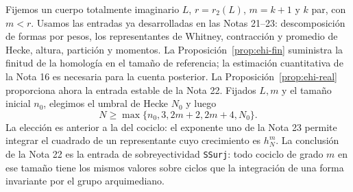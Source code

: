 Fijemos un cuerpo totalmente imaginario $L$, $r=r_2(L)$, $m=k+1$ y $k$ par, con $m<r$. Usamos las entradas ya desarrolladas en las Notas 21--23: descomposición de formas por pesos, los representantes de Whitney, contracción y promedio de Hecke, altura, partición y momentos. La Proposición~\ref{prop:ehi-fin} suministra la finitud de la homología en el tamaño de referencia; la estimación cuantitativa de la Nota 16 es necesaria para la cuenta posterior. La Proposición~\ref{prop:ehi-real} proporciona ahora la entrada estable de la Nota 22. Fijados $L,m$ y el tamaño inicial $n_0$, elegimos el umbral de Hecke $N_0$ y luego
\begin{equation}
 N\ge\max\{n_0,3,2m+2,2m+4,N_0\}.
 \label{eq:ehi-threshold}
\end{equation}
La elección es anterior a la del cociclo: el exponente uno de la Nota 23 permite integrar el cuadrado de un representante cuyo crecimiento es $h_N^m$. La conclusión de la Nota 22 es la entrada de sobreyectividad \texttt{SSurj}: todo cociclo de grado $m$ en ese tamaño tiene los mismos valores sobre ciclos que la integración de una forma invariante por el grupo arquimediano.

